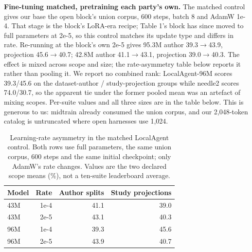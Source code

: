 \documentclass{article}
\begin{document}
\textbf{Fine-tuning matched, pretraining each party's own.} The matched control gives our base
the open block's union corpus, 600 steps, batch 8 and AdamW 1e-4. That stage is the block's LoRA-era recipe; Table 1's block has since moved to full parameters at 2e-5, so this control matches its update type and differs in rate. Re-running at the block's own 2e-5 gives 95.3M author 39.3$\rightarrow$43.9, projection 45.6$\rightarrow$40.7; 42.8M author 41.1$\rightarrow$43.1, projection 39.0$\rightarrow$40.3. The effect is mixed across scope and size; the rate-asymmetry table below reports it rather than pooling it.
We report no combined rank: LocalAgent-96M scores 39.3/45.6 on the dataset-author / study-projection
groups while needle2 scores 74.0/30.7, so the apparent tie under the former pooled mean was an
artefact of mixing scopes. Per-suite values and all three sizes are in the table below. This is
generous to us: midtrain already consumed the union corpus, and
 our 2,048-token catalog is untruncated where open harnesses use 1,024.


\begin{table}[htbp]
\caption{Learning-rate asymmetry in the matched LocalAgent control. Both rows use full parameters, the same union corpus, 600 steps and the same initial checkpoint; only AdamW's rate changes. Values are the two declared scope means (\%), not a ten-suite leaderboard average.}
\label{tab:rate_asymmetry}
\centering
\footnotesize
\begin{tabular}{lrrr}
\toprule
Model & Rate & Author splits & Study projections \\
\midrule
43M & 1e-4 & 41.1 & 39.0 \\
43M & 2e-5 & 43.1 & 40.3 \\
96M & 1e-4 & 39.3 & 45.6 \\
96M & 2e-5 & 43.9 & 40.7 \\
\bottomrule
\end{tabular}
\end{table}
\end{document}
